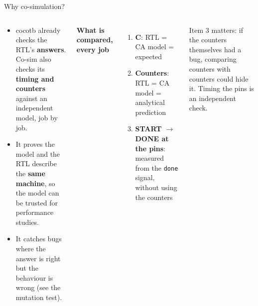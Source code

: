 \documentclass[aspectratio=169,11pt]{beamer}
\newcommand{\sig}[1]{\texttt{#1}}
\begin{document}
\begin{frame}{Why co-simulation?}
  \begin{columns}[T]
    \begin{why}
      \begin{itemize}
        \item cocotb already checks the RTL's \textbf{answers}. Co-sim also checks its
              \textbf{timing and counters} against an independent model, job by job.
        \item It proves the model and the RTL describe the \textbf{same machine}, so the model
              can be trusted for performance studies.
        \item It catches bugs where the answer is right but the behaviour is wrong
              (see the mutation test).
      \end{itemize}
    \end{why}
    \small
    \textbf{What is compared, every job}
    \begin{enumerate}
      \item \textbf{C}: RTL = CA model = expected
      \item \textbf{Counters}: RTL = CA model = analytical prediction
      \item \textbf{START $\to$ DONE at the pins}: measured from the \sig{done} signal, without using
            the counters
    \end{enumerate}
    \vspace{2mm}
    \footnotesize\color{muted} Item 3 matters: if the counters themselves had a bug, comparing
    counters with counters could hide it. Timing the pins is an independent check.
  \end{columns}
\end{frame}
\end{document}
